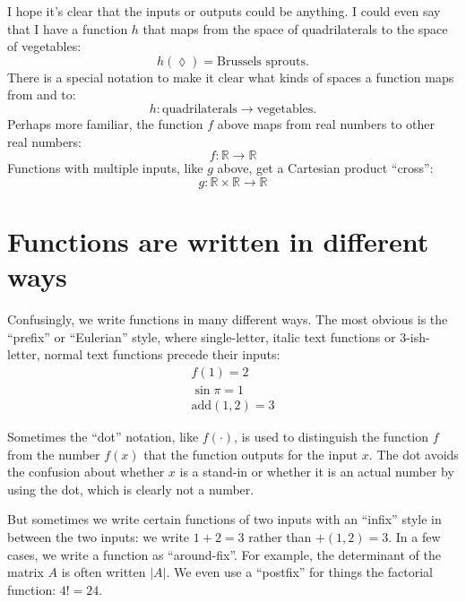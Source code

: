 I hope it's clear that the inputs or outputs could be anything. I could even
say that I have a function $h$ that maps from the space of quadrilaterals to
the space of vegetables:
\begin{equation*}
h(\lozenge) = \text{Brussels sprouts}.
\end{equation*}
There is a special notation to make it clear what kinds of spaces a function
maps from and to:
\begin{equation*}
h : \text{quadrilaterals} \to \text{vegetables}.
\end{equation*}
Perhaps more familiar, the function $f$ above maps from real numbers to other
real numbers:
\begin{equation*}
f : \mathbb{R} \to \mathbb{R}
\end{equation*}
Functions with multiple inputs, like $g$ above, get a Cartesian product
``cross'':
\begin{equation*}
g : \mathbb{R} \times \mathbb{R} \to \mathbb{R}
\end{equation*}



\section{Functions are written in different ways}

Confusingly, we write functions in many different ways. The most obvious is the
``prefix'' or ``Eulerian'' style, where single-letter, italic text functions or
3-ish-letter, normal text functions precede their inputs:
\begin{gather*}
f(1) = 2 \\
\sin \pi = 1 \\
\mathrm{add}(1, 2) = 3
\end{gather*}



Sometimes the ``dot'' notation, like $f(\cdot)$, is used to distinguish the
function $f$ from the number $f(x)$ that the function outputs for the input
$x$. The dot avoids the confusion about whether $x$ is a stand-in or whether it
is an actual number by using the dot, which is clearly not a number.

But sometimes we write certain functions of two inputs with an ``infix'' style
in between the two inputs: we write $1 + 2 = 3$ rather than $\mathord{+}(1, 2)
= 3$. In a few cases, we write a function as ``around-fix''. For example, the
determinant of the matrix $A$ is often written $|A|$. We even use a ``postfix''
for things the factorial function: $4! = 24$.

